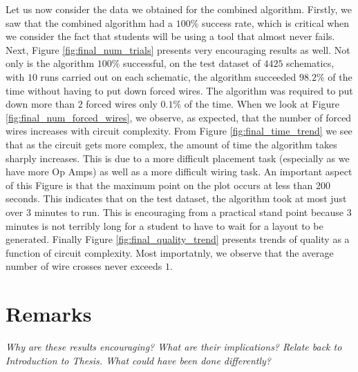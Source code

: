 Let us now consider the data we obtained for the combined algorithm. Firstly, we
saw that the combined algorithm had a $100\%$ success rate, which is critical
when we consider the fact that students will be using a tool that almost never fails.
Next, Figure \ref{fig:final_num_trials} presents very encouraging results as well.
Not only is the algorithm $100\%$ successful, on the test dataset of $4425$
schematics, with $10$ runs carried out on each schematic, the algorithm succeeded
$98.2\%$ of the time without having to put down forced wires. The algorithm was
required to put down more than $2$ forced wires only $0.1\%$ of the time. When
we look at Figure \ref{fig:final_num_forced_wires}, we observe, as expected, that
the number of forced wires increases with circuit complexity. From Figure
\ref{fig:final_time_trend} we see that as the circuit gets more complex, the
amount of time the algorithm takes sharply increases. This is due to a more
difficult placement task (especially as we have more Op Amps) as well as a more
difficult wiring task. An important aspect of this Figure is that the maximum
point on the plot occurs at less than $200$ seconds. This indicates that on the
test dataset, the algorithm took at most just over $3$ minutes to run. This is
encouraging from a practical stand point because $3$ minutes is not terribly long
for a student to have to wait for a layout to be generated.
Finally Figure \ref{fig:final_quality_trend} presents trends of quality as a
function of circuit complexity. Most importatnly, we observe that the average
number of wire crosses never exceeds $1$.

\section{Remarks}

\textit{Why are these results encouraging? What are their implications? Relate
back to Introduction to Thesis. What could have been done differently?}
